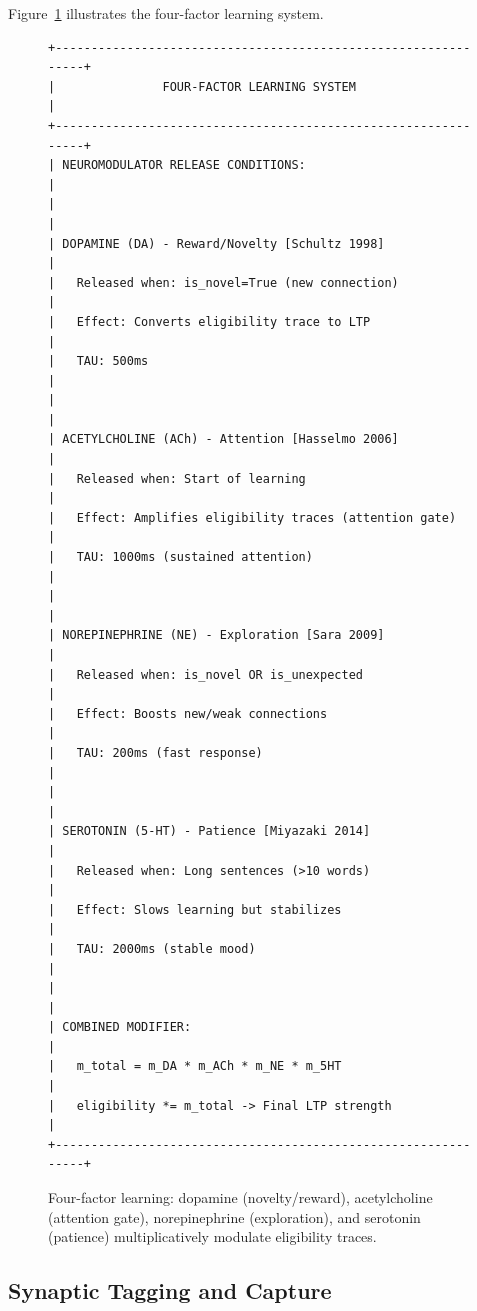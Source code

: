 \documentclass[11pt]{article}
\begin{document}
Figure~\ref{fig:neuromod} illustrates the four-factor learning system.

\begin{figure}[ht]
\centering
\begin{Verbatim}[fontsize=\scriptsize,frame=single]
+---------------------------------------------------------------+
|               FOUR-FACTOR LEARNING SYSTEM                      |
+---------------------------------------------------------------+
| NEUROMODULATOR RELEASE CONDITIONS:                            |
|                                                               |
| DOPAMINE (DA) - Reward/Novelty [Schultz 1998]                 |
|   Released when: is_novel=True (new connection)               |
|   Effect: Converts eligibility trace to LTP                   |
|   TAU: 500ms                                                  |
|                                                               |
| ACETYLCHOLINE (ACh) - Attention [Hasselmo 2006]               |
|   Released when: Start of learning                            |
|   Effect: Amplifies eligibility traces (attention gate)       |
|   TAU: 1000ms (sustained attention)                           |
|                                                               |
| NOREPINEPHRINE (NE) - Exploration [Sara 2009]                 |
|   Released when: is_novel OR is_unexpected                    |
|   Effect: Boosts new/weak connections                         |
|   TAU: 200ms (fast response)                                  |
|                                                               |
| SEROTONIN (5-HT) - Patience [Miyazaki 2014]                   |
|   Released when: Long sentences (>10 words)                   |
|   Effect: Slows learning but stabilizes                       |
|   TAU: 2000ms (stable mood)                                   |
|                                                               |
| COMBINED MODIFIER:                                            |
|   m_total = m_DA * m_ACh * m_NE * m_5HT                       |
|   eligibility *= m_total -> Final LTP strength                |
+---------------------------------------------------------------+
\end{Verbatim}
\caption{Four-factor learning: dopamine (novelty/reward), acetylcholine (attention gate), norepinephrine (exploration), and serotonin (patience) multiplicatively modulate eligibility traces.}
\label{fig:neuromod}
\end{figure}

\subsection{Synaptic Tagging and Capture}
\end{document}
